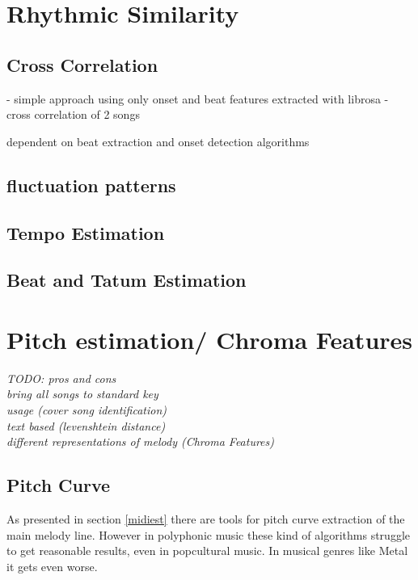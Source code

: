 \chapter{Rhythmic Similarity}\label{rhythmsimc}

\section{Cross Correlation}

- simple approach using only onset and beat features extracted with librosa
- cross correlation of 2 songs

dependent on beat extraction and onset detection algorithms

\section{fluctuation patterns}

\section{Tempo Estimation}

\section{Beat and Tatum Estimation}


\chapter{Pitch estimation/ Chroma Features}\label{melsimc}

\textit{TODO: 
pros and cons\\
bring all songs to standard key \\
usage (cover song identification)\\
text based (levenshtein distance)\\
different representations of melody (Chroma Features)\\}

\section{Pitch Curve}

As presented in section \ref{midiest} there are tools for pitch curve extraction of the main melody line. However in polyphonic music these kind of algorithms struggle to get reasonable results, even in popcultural music. In musical genres like Metal it gets even worse. 


